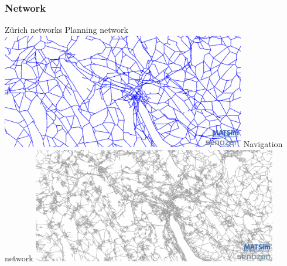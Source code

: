 \subsubsection{Network}
%
%
%
{Zürich networks}%
{\label{fig:zhnetwork}}%
{%
  \createsubfigure%
  {Planning network}%
  {\includegraphics[width=0.8\textwidth,angle=0]{using/figures/planning.png}}%
  {\label{fig:planningnetwork}}%
  {}%
  \createsubfigure%
  {Navigation network}%
	{\includegraphics[width=0.8\textwidth,angle=0]{using/figures/navigation.png}}%
  {\label{fig:navigationnetwork}}%
  {}%
}%
